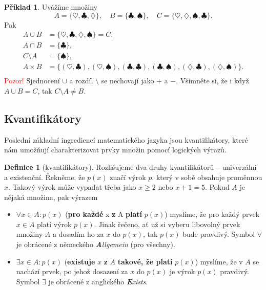 \documentclass[a4paper,11pt]{article}
\theoremstyle{definition}
\newtheorem{exm}[thm]{Příklad}
\newtheorem{dfn}[thm]{Definice}
\begin{document}
\begin{exm}
 Uvážíme množiny
 \[
  A = \{\heartsuit, \clubsuit, \diamondsuit \}, \quad B = \{ \clubsuit,
  \spadesuit \}, \quad C = \{\heartsuit, \diamondsuit, \spadesuit, \clubsuit\}.
 \]
 Pak
 \begin{align*}
  A \cup B &= \{\heartsuit, \clubsuit, \diamondsuit, \spadesuit\} = C, \\
  A \cap B &= \{\clubsuit\}, \\
  C \setminus A &= \{\spadesuit\}, \\
  A \times B &= \{(\heartsuit, \clubsuit), (\heartsuit, \spadesuit), (\clubsuit,
  \clubsuit), (\clubsuit, \spadesuit), (\diamondsuit, \clubsuit),
  (\diamondsuit, \spadesuit)\}. \\
 \end{align*}
 \textcolor{red}{Pozor!} Sjednocení $ \cup $ a rozdíl $ \setminus $ se nechovají
 jako $+$ a $-$. Všimněte si, že i když $A \cup B = C$, tak $C \setminus A \neq
 B$.
\end{exm}

\subsection{Kvantifikátory}
\label{ssec:kvantifikatory}

Poslední základní ingrediencí matematického jazyka jsou kvantifikátory, které
nám umožňují charakterizovat prvky množin pomocí logických výrazů.

\begin{dfn}[kvantifikátory]
 Rozlišujeme dva druhy kvantifikátorů -- univerzální a existenční. Řekněme, že
 $p(x)$ značí výrok $p$, který v sobě obsahuje proměnnou $x$. Takový výrok může
 vypadat třeba jako $x \geq 2$ nebo $x + 1 = 5$. Pokud $A$ je nějaká množina,
 pak výrazem
 \begin{itemize}
  \item $ \forall x \in A: p(x)$ (\textbf{pro každé} x \textbf{z} A
   \textbf{platí} $p(x)$) myslíme, že pro každý prvek $x \in A$ platí výrok
   $p(x)$. Jinak řečeno, ať už si vyberu libovolný prvek množiny $A$ a dosadím
   ho za $x$ do $p(x)$, tak $p(x)$ bude pravdivý. Symbol $ \forall $ je obrácené
    z německého \emph{\textbf{A}llgemein} (pro všechny).
  \item $ \exists x \in A: p(x)$ (\textbf{existuje} $x$ \textbf{z} $A$
   \textbf{takové, že platí} $p(x)$) myslíme, že v $A$ se nachází prvek, po
   jehož dosazení za $x$ do $p(x)$ je výrok $p(x)$ pravdivý. Symbol $ \exists $
   je obrácené  z anglického \emph{\textbf{E}xists}.
 \end{itemize}
\end{dfn}
\end{document}

